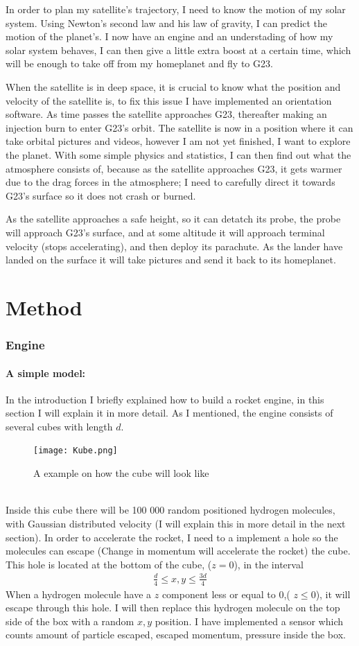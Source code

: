 \documentclass[a4paper,11pt,english]{report}
\newcommand{\mychapter}[2]{
  \setcounter{chapter}{#1}
  \setcounter{section}{0}
  \chapter*{#2}
  \addcontentsline{toc}{chapter}{#2}
}
\begin{document}
In order to plan my satellite's
trajectory, I need to know the motion of my solar system.  Using Newton's
second law and his law of gravity, I can predict the motion of the planet's.  I 
now have an engine and an understading of how my solar system behaves,
I can then give
a little extra boost at a certain time, which will be enough to take off from
my homeplanet and fly to G23.

When  the satellite is in deep space, it is crucial to know what the position and
velocity of the satellite is, to fix this issue I have implemented an orientation
software. As time passes the satellite approaches G23, thereafter making an
injection burn
 to enter G23's orbit. The satellite is now in a position where it can take
 orbital pictures
and videos, however I am not yet finished, I want to explore the planet. With
some simple physics and statistics, I can then find out what the atmosphere consists
of, because as the satellite approaches G23,  it gets warmer due to the drag forces in the
atmosphere; I need to carefully direct it towards G23's surface
so it does not crash or burned.

As the satellite approaches a safe height,  so it can detatch its probe, the
probe will approach G23's surface, and at some altitude it will approach
terminal velocity
(stops accelerating), and then  deploy its parachute. As the lander have landed
on the surface it will take pictures and send it back to its homeplanet.



\newpage
\mychapter{2}{Method}
\subsection{Engine}
\subsubsection{A simple model:}
In the introduction I briefly explained how to build a rocket engine, in this
section I will explain it in more detail. As I mentioned, the engine consists of
several cubes with length \(d\).
\begin{figure}[h]
  \centering
  \texttt{[image: Kube.png]}
  \caption{A example on how the cube will look like}
\end{figure}
\\
Inside this cube there will be 100 000 random positioned hydrogen molecules,
with Gaussian distributed velocity (I will explain this in more detail in the
next section). In order to accelerate the rocket, I need to a implement a hole so
the molecules can escape (Change in momentum will accelerate the rocket) the
cube. This hole is located at the bottom of the cube, (\(z  = 0\)), in the
interval
\begin{align}
  \frac{d}{4} \le x,y \le \frac{3d}{4}
\end{align}
When a hydrogen molecule have a \(z\) component less or equal to \(0\),( \(z \le
0\)), it will
escape through this hole. I will then replace this hydrogen molecule on the
top side of the box with a random \(x,y\) position. I have implemented a sensor
which counts amount of particle escaped, escaped momentum, pressure inside the
box.
\newpage
\end{document}
